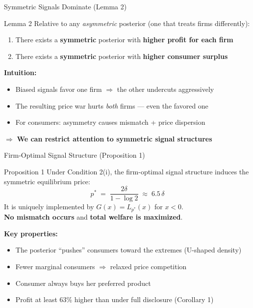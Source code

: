 \documentclass[aspectratio=169, 11pt]{beamer}
\begin{document}
\begin{frame}{Symmetric Signals Dominate (Lemma 2)}

\begin{block}{Lemma 2}
Relative to any \emph{asymmetric} posterior (one that treats firms differently):
\begin{enumerate}
    \item[(i)] There exists a \textbf{symmetric} posterior with \textbf{higher profit for each firm}
    \item[(ii)] There exists a \textbf{symmetric} posterior with \textbf{higher consumer surplus}
\end{enumerate}
\end{block}

\bigskip

\textbf{Intuition:}
\begin{itemize}
    \item Biased signals favor one firm $\Rightarrow$ the other undercuts aggressively
    \item The resulting price war hurts \emph{both} firms --- even the favored one
    \item For consumers: asymmetry causes mismatch + price dispersion
\end{itemize}

\bigskip

$\Rightarrow$ \textbf{We can restrict attention to symmetric signal structures}

\end{frame}

\begin{frame}{Firm-Optimal Signal Structure (Proposition 1)}

\begin{block}{Proposition 1}
Under Condition 2(i), the firm-optimal signal structure induces the symmetric equilibrium price:
$$p^* \;=\; \frac{2\delta}{1 - \log 2} \;\approx\; 6.5\,\delta$$
It is uniquely implemented by $G(x) = L_{p^*}(x)$ for $x < 0$. \\[4pt]
\textbf{No mismatch occurs} and \textbf{total welfare is maximized}.
\end{block}

\bigskip

\textbf{Key properties:}
\begin{itemize}
    \item The posterior ``pushes'' consumers toward the extremes (U-shaped density)
    \item Fewer marginal consumers $\Rightarrow$ relaxed price competition
    \item Consumer always buys her preferred product
    \item Profit at least 63\% higher than under full disclosure (Corollary 1)
\end{itemize}

\end{frame}
\end{document}
